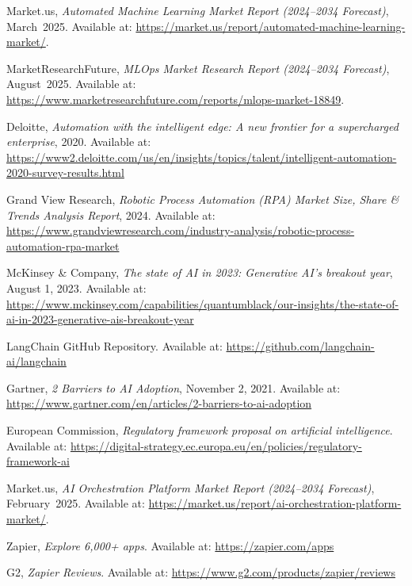 \documentclass[11pt, a4paper, oneside]{article}
\begin{document}
\begin{thebibliography}{99}
    Market.us, \textit{Automated Machine Learning Market Report (2024--2034 Forecast)}, March~2025.  
    Available at: \url{https://market.us/report/automated-machine-learning-market/}.

    MarketResearchFuture, \textit{MLOps Market Research Report (2024--2034 Forecast)}, August~2025.  
    Available at: \url{https://www.marketresearchfuture.com/reports/mlops-market-18849}.

    Deloitte, \textit{Automation with the intelligent edge: A new frontier for a supercharged enterprise}, 2020. Available at: \url{https://www2.deloitte.com/us/en/insights/topics/talent/intelligent-automation-2020-survey-results.html}

    Grand View Research, \textit{Robotic Process Automation (RPA) Market Size, Share \& Trends Analysis Report}, 2024. Available at: \url{https://www.grandviewresearch.com/industry-analysis/robotic-process-automation-rpa-market}

    McKinsey \& Company, \textit{The state of AI in 2023: Generative AI’s breakout year}, August 1, 2023. Available at: \url{https://www.mckinsey.com/capabilities/quantumblack/our-insights/the-state-of-ai-in-2023-generative-ais-breakout-year}


    LangChain GitHub Repository. Available at: \url{https://github.com/langchain-ai/langchain}

    Gartner, \textit{2 Barriers to AI Adoption}, November 2, 2021. Available at: \url{https://www.gartner.com/en/articles/2-barriers-to-ai-adoption}

    European Commission, \textit{Regulatory framework proposal on artificial intelligence}. Available at: \url{https://digital-strategy.ec.europa.eu/en/policies/regulatory-framework-ai}
    
    Market.us, \textit{AI Orchestration Platform Market Report (2024--2034 Forecast)}, February~2025. Available at: \url{https://market.us/report/ai-orchestration-platform-market/}.

    Zapier, \textit{Explore 6,000+ apps}. Available at: \url{https://zapier.com/apps}

    G2, \textit{Zapier Reviews}. Available at: \url{https://www.g2.com/products/zapier/reviews}


\end{thebibliography}
\end{document}
